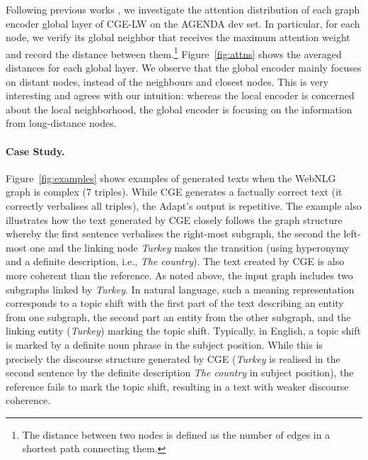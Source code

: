 \documentclass[11pt,a4paper]{article}
\begin{document}
Following previous works \cite{voita-etal-2019-analyzing, cai-lam-2020-graph}, we investigate the attention distribution of each graph encoder global layer of {\selectfont CGE-LW} on the AGENDA dev set. In particular, for each node, we verify its global neighbor that receives the maximum attention weight and record the distance between them.\footnote{The distance between two nodes is defined as the number of edges in a shortest path connecting them.} Figure~\ref{fig:attns} shows the averaged distances for each global layer. We observe that the global encoder mainly focuses on distant nodes, instead of the neighbours and closest nodes. This is very interesting and agrees with our intuition: whereas the local encoder is concerned about the local neighborhood, the global encoder is focusing on the information from long-distance nodes.
\vspace{-2mm}
\paragraph{Case Study.}
Figure~\ref{fig:examples} shows examples of generated texts when the WebNLG graph is complex (7 triples). While {\selectfont CGE} generates a factually correct text (it correctly verbalises all triples), the Adapt's output is repetitive. The example also illustrates how the text generated by {\selectfont CGE} closely follows the graph structure whereby the first sentence verbalises the right-most subgraph, the second the left-most one and the linking node \textit{Turkey} makes the transition (using hyperonymy and a definite description, i.e., \textit{The country}). The text created by {\selectfont CGE} is also more coherent than the reference. As noted above, the input graph includes two subgraphs linked by \textit{Turkey}. In natural language, such a meaning representation corresponds to a topic shift with the first part of the text describing an entity from one subgraph, the second part an entity from the other subgraph, and the linking entity (\textit{Turkey}) marking the topic shift. Typically, in English, a topic shift is marked by a definite noun phrase in the subject position. While this is precisely the discourse structure generated by {\selectfont CGE} (\textit{Turkey} is realised in the second sentence by the definite description \textit{The country} in subject position), the reference fails to mark the topic shift, resulting in a text with weaker discourse coherence.
\end{document}
